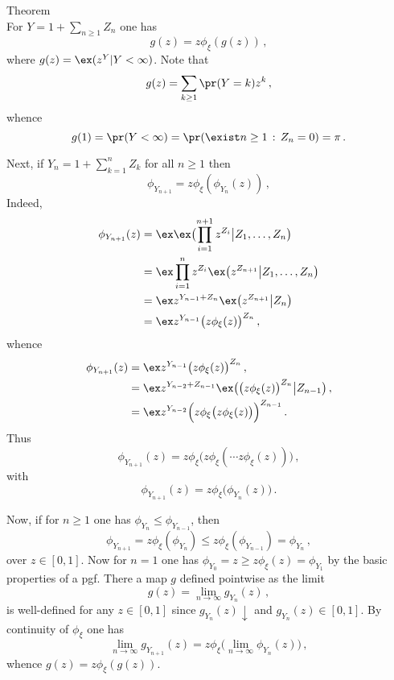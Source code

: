 
\noindent Theorem \hfill\\
For $Y = 1 + \sum_{n\geq1} Z_n$ one has 
\[ g(z) = z\phi_\xi(g(z)) \,,\]
where $g(z) = \ex( z^Y \vert Y < \infty)$. Note that
\[ g(z) = \sum_{k\geq 1}\pr(Y=k)z^k\,,\]
whence
\[ g(1) = \pr(Y<\infty) = \pr(\exist n\geq1\,:\,Z_n=0) = \pi \,. \]

Next, if $Y_n = 1+\sum_{k=1}^n Z_k$ for all $n\geq1$ then
\[ \phi_{Y_{n+1}} = z\phi_\xi(\phi_{Y_n}(z)) \,, \]
Indeed, \begin{align*}
	\phi_{Y_{n+1}}(z)
		&= \ex\ex\bigl( \prod_{i=1}^{n+1} z^{Z_i} \bigr. \bigr\lvert Z_1,\ldots,Z_n\bigr)\\
		&= \ex\prod_{i=1}^n z^{Z_i}  \ex\bigl( z^{Z_{n+1}} \bigr. \bigr\lvert Z_1,\ldots,Z_n\bigr)\\
		&= \ex z^{Y_{n-1}+Z_n} \ex\bigl( z^{Z_{n+1}} \bigr. \bigr\lvert Z_n\bigr)\\
		&= \ex z^{Y_{n-1}} \bigl(z \phi_\xi(z)\bigr)^{Z_n}\,, \\
\end{align*}
whence \begin{align*}
	\phi_{Y_{n+1}}(z)
		&= \ex z^{Y_{n-1}} \bigl(z \phi_\xi(z)\bigr)^{Z_n}\,, \\
		&= \ex z^{Y_{n-2}+Z_{n-1}} \ex\bigl( \bigl(z \phi_\xi(z)\bigr)^{Z_n} \bigr. \bigr\lvert Z_{n-1}\bigr) \,, \\
		&= \ex z^{Y_{n-2}} \Bigl( z \phi_\xi\bigl(z \phi_\xi(z)\bigr) \Bigr)^{Z_{n-1}} \,. \\
\end{align*}
Thus
\[ \phi_{Y_{n+1}}(z) = z \phi_\xi\bigl( z \phi_\xi( \cdots z\phi_\xi( z ) ) \bigr) \,, \]
with
\[ \phi_{Y_{n+1}}(z) = z \phi_\xi\bigl( \phi_{Y_n}( z ) \bigr) \,. \]

Now, if for $n\geq 1$ one has $\phi_{Y_n}\leq \phi_{Y_{n-1}}$, then
\[ \phi_{Y_{n+1}} = z\phi_\xi( \phi_{Y_n} ) \leq z\phi_\xi( \phi_{Y_{n-1}} ) = \phi_{Y_n}\,,\]
over $z\in[0,1]$. Now for $n=1$ one has $\phi_{Y_0} = z \geq z \phi_\xi(z) = \phi_{Y_1}$
by the basic properties of a pgf. There a map $g$ defined pointwise as the limit
\[ g(z) = \lim_{n\to\infty} g_{Y_n}(z) \,, \]
is well-defined for any $z\in[0,1]$ since $g_{Y_n}(z) \downarrow$ and $g_{Y_n}(z) \in [0,1]$.
By continuity of $\phi_\xi$ one has
\[ \lim_{n\to\infty} g_{Y_{n+1}}(z) = z \phi_\xi\bigl( \lim_{n\to\infty} \phi_{Y_n}( z ) \bigr) \,, \]
whence $g(z) = z\phi_\xi( g(z) )$.


